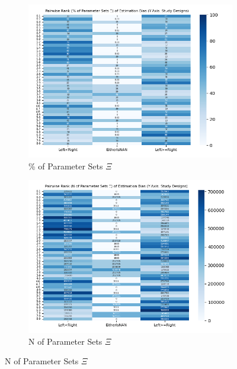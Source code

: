 \documentclass[12pt]{article}
\begin{document}
\begin{figure}[H]
	\centering
	\caption{Pairwise Rank of Estimation Bias (Y-Axis: Study Designs)}
	\begin{subfigure}[t]{0.45\linewidth}
		\centering
		\caption{\% of Parameter Sets $\Xi$}
		\includegraphics[scale=0.5]{VEmethod_RelDirection1b_Pairwise}
	\end{subfigure}
	\begin{subfigure}[t]{0.45\linewidth}
		\centering
		\caption{N of Parameter Sets $\Xi$}
		\includegraphics[scale=0.5]{VEmethod_RelDirection1b_Pairwise_N}
	\end{subfigure}


\end{figure}
\end{document}
